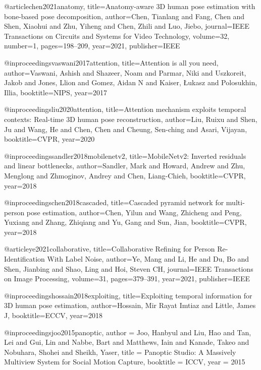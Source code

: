 @article{chen2021anatomy,
  title={Anatomy-aware {3D} human pose estimation with bone-based pose decomposition},
  author={Chen, Tianlang and Fang, Chen and Shen, Xiaohui and Zhu, Yiheng and Chen, Zhili and Luo, Jiebo},
  journal={IEEE Transactions on Circuits and Systems for Video Technology},
  volume={32},
  number={1},
  pages={198--209},
  year={2021},
  publisher={IEEE}
}

@inproceedings{vaswani2017attention,
  title={Attention is all you need},
  author={Vaswani, Ashish and Shazeer, Noam and Parmar, Niki and Uszkoreit, Jakob and Jones, Llion and Gomez, Aidan N and Kaiser, {\L}ukasz and Polosukhin, Illia},
  booktitle=NIPS,
  year={2017}
}

@inproceedings{liu2020attention,
  title={Attention mechanism exploits temporal contexts: Real-time {3D} human pose reconstruction},
  author={Liu, Ruixu and Shen, Ju and Wang, He and Chen, Chen and Cheung, Sen-ching and Asari, Vijayan},
  booktitle=CVPR,
  year={2020}
}

@inproceedings{sandler2018mobilenetv2,
  title={Mobile{N}etv2: Inverted residuals and linear bottlenecks},
  author={Sandler, Mark and Howard, Andrew and Zhu, Menglong and Zhmoginov, Andrey and Chen, Liang-Chieh},
  booktitle=CVPR,
  year={2018}
}

@inproceedings{chen2018cascaded,
  title={Cascaded pyramid network for multi-person pose estimation},
  author={Chen, Yilun and Wang, Zhicheng and Peng, Yuxiang and Zhang, Zhiqiang and Yu, Gang and Sun, Jian},
  booktitle=CVPR,
  year={2018}
}

@article{ye2021collaborative,
  title={Collaborative Refining for Person Re-Identification With Label Noise},
  author={Ye, Mang and Li, He and Du, Bo and Shen, Jianbing and Shao, Ling and Hoi, Steven CH},
  journal={IEEE Transactions on Image Processing},
  volume={31},
  pages={379--391},
  year={2021},
  publisher={IEEE}
}

@inproceedings{hossain2018exploiting,
  title={Exploiting temporal information for {3D} human pose estimation},
  author={Hossain, Mir Rayat Imtiaz and Little, James J},
  booktitle=ECCV,
  year={2018}
}

@inproceedings{joo2015panoptic,
    author = {Joo, Hanbyul and Liu, Hao and Tan, Lei and Gui, Lin and Nabbe, Bart and Matthews, Iain and Kanade, Takeo and Nobuhara, Shohei and Sheikh, Yaser},
    title = {Panoptic Studio: A Massively Multiview System for Social Motion Capture},
    booktitle = {ICCV},
    year = {2015} 
}

